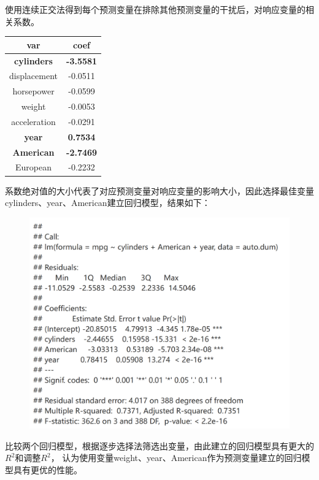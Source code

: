 \documentclass[12pt,a4paper]{article}
\begin{document}
    使用连续正交法得到每个预测变量在排除其他预测变量的干扰后，对响应变量的相关系数。
    \begin{longtable}{c|c}
        \hline
        var & coef\\
        \hline
        \textbf{cylinders} & \textbf{-3.5581}\\
        \hline
        displacement & -0.0511\\
        \hline
        horsepower & -0.0599\\
        \hline
        weight & -0.0053\\
        \hline
        acceleration & -0.0291\\
        \hline
        \textbf{year} & \textbf{0.7534}\\
        \hline
        \textbf{American} & \textbf{-2.7469}\\
        \hline
        European & -0.2232\\
        \hline
    \end{longtable}
    系数绝对值的大小代表了对应预测变量对响应变量的影响大小，因此选择最佳变量cylinders、year、American建立回归模型，结果如下：
    \begin{figure}[H]
        \centering
        \includegraphics[scale=0.3]{Ortho3.png}
    \end{figure}
    比较两个回归模型，根据逐步选择法筛选出变量，由此建立的回归模型具有更大的$R^2$和调整$R^2$，
    认为使用变量weight、year、American作为预测变量建立的回归模型具有更优的性能。
    \section{}
    \vspace{10pt}
\end{document}
